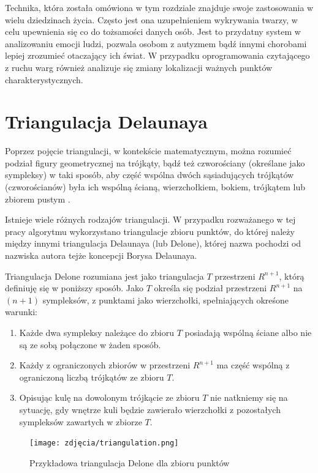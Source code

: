Technika, która została omówiona w tym rozdziale znajduje swoje zastosowania w wielu dziedzinach życia. Często jest ona uzupełnieniem wykrywania twarzy, w celu upewnienia się co do tożsamości danych osób. Jest to przydatny system w analizowaniu emocji ludzi, pozwala osobom z autyzmem bądź innymi chorobami lepiej zrozumieć otaczający ich świat. W przypadku oprogramowania czytającego z ruchu warg również analizuje się zmiany lokalizacji ważnych punktów charakterystycznych.


\section{Triangulacja Delaunaya}
Poprzez pojęcie triangulacji, w kontekście matematycznym, można rozumieć podział figury geometrycznej na trójkąty, bądź też czworościany (określane jako sympleksy) w taki sposób, aby część wspólna dwóch sąsiadujących trójkątów (czworościanów) była ich wspólną ścianą, wierzchołkiem, bokiem, trójkątem lub zbiorem pustym \cite{triangulation}.

Istnieje wiele różnych rodzajów triangulacji. W przypadku rozważanego w tej pracy algorytmu wykorzystano triangulacje zbioru punktów, do której należy między innymi triangulacja Delaunaya (lub Delone), której nazwa pochodzi od nazwiska autora tejże koncepcji Borysa Delaunaya. 

Triangulacja Delone \cite{tDelone} rozumiana jest jako triangulacja $T$ przestrzeni $R^{n+1}$, którą definiuję się w poniższy sposób. Jako $T$ określa się podział przestrzeni $R^{n+1}$ na $(n+1)$ sympleksów, z punktami jako wierzchołki, spełniających okreśone warunki:

\begin{enumerate}
    \item Każde dwa sympleksy należące do zbioru $T$ posiadają wspólną ściane albo nie są ze sobą połączone w żaden sposób.
    \item Każdy z ograniczonych zbiorów w przestrzeni $R^{n+1}$ ma część wspólną z ograniczoną liczbą trójkątów ze zbioru $T$.
    \item Opisując kulę na dowolonym trójkącie ze zbioru $T$ nie natkniemy się na sytuację, gdy wnętrze kuli będzie zawierało wierzchołki z pozostałych sympleksów zawartych w zbiorze $T$.
\end{enumerate}

\begin{figure}[h]
	\centering
	\texttt{[image: zdjęcia/triangulation.png]}
	\caption{Przykładowa triangulacja Delone dla zbioru punktów \cite{tDelone}}
	\label{fig:delone}
\end{figure}

